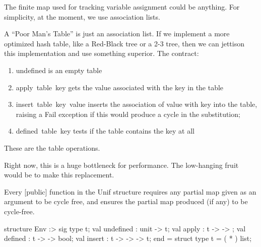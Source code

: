 \begin{node}
The finite map used for tracking variable assignment could be
anything. For simplicity, at the moment, we use association lists.

A ``Poor Man's Table'' is just an association list.
If we implement a more optimized hash table, like a Red-Black tree or
a 2-3 tree, then we can jettison this implementation and use something
superior. The contract:
\begin{enumerate}
\item {\Tt{}undefined\nwendquote} is an empty table
\item {\Tt{}apply\ table\ key\nwendquote} gets the value associated with the {\Tt{}key\nwendquote}
  in the {\Tt{}table\nwendquote}
\item {\Tt{}insert\ table\ key\ value\nwendquote} inserts the association of {\Tt{}value\nwendquote}
  with {\Tt{}key\nwendquote} into the {\Tt{}table\nwendquote}, raising a {\Tt{}Fail\nwendquote} exception if
  this would produce a cycle in the substitution;
\item {\Tt{}defined\ table\ key\nwendquote} tests if the {\Tt{}table\nwendquote} contains the
  {\Tt{}key\nwendquote} at all
\end{enumerate}
These are the table operations.

Right now, this is a huge bottleneck for performance. The low-hanging
fruit would be to make this replacement.
\end{node}

\begin{invariant}\label{invariant:unification:cycle-free}
Every [public] function in the {\Tt{}Unif\nwendquote} structure requires any
{\Tt{}\nwendquote} partial map given as an argument to be cycle free, and
ensures the {\Tt{}\nwendquote} partial map produced (if any) to be cycle-free.
\end{invariant}

\nwenddocs{}\endmoddef\nwstartdeflinemarkup{}\nwenddeflinemarkup
structure Env :>
            sig
              type t;
              val undefined : unit -> t;
              val apply : t ->  -> ;
              val defined : t ->  -> bool;
              val insert : t ->  ->  -> t;
            end =
struct
type t = ( * ) list;


